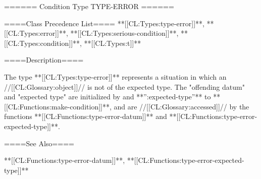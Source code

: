 ====== Condition Type TYPE-ERROR ======

====Class Precedence List==== **[[CL:Types:type-error]]**, **[[CL:Types:error]]**, **[[CL:Types:serious-condition]]**, **[[CL:Types:condition]]**, **[[CL:Types:t]]**

====Description====

The type **[[CL:Types:type-error]]** represents a situation in which an //[[CL:Glossary:object]]// is not of the expected type. The "offending datum" and "expected type" are initialized by  and **'':expected-type''** to **[[CL:Functions:make-condition]]**, and are //[[CL:Glossary:accessed]]// by the functions **[[CL:Functions:type-error-datum]]** and **[[CL:Functions:type-error-expected-type]]**.

====See Also====

**[[CL:Functions:type-error-datum]]**, **[[CL:Functions:type-error-expected-type]]**

